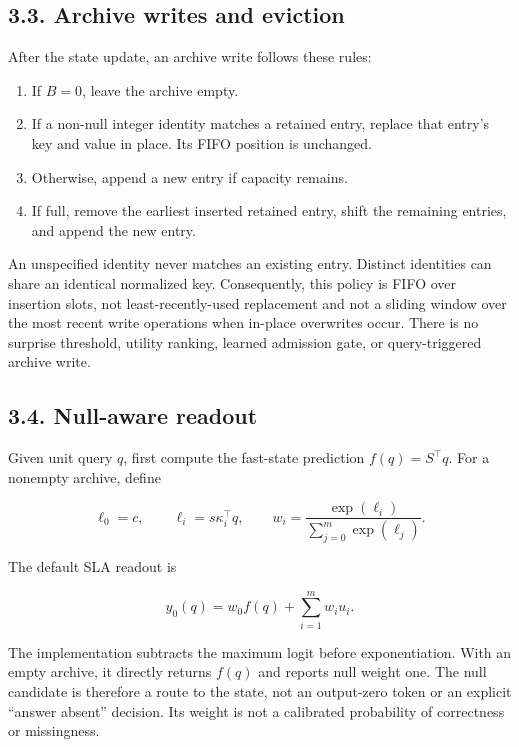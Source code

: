 \documentclass[11pt,a4paper]{article}
\providecommand{\tightlist}{\setlength{\itemsep}{0pt}\setlength{\parskip}{0pt}}
\begin{document}
\subsection{3.3. Archive writes and eviction}\label{archive-writes-and-eviction}

After the state update, an archive write follows these rules:

\begin{enumerate}
\def\labelenumi{\arabic{enumi}.}
\tightlist
\item
  If \(B=0\), leave the archive empty.
\item
  If a non-null integer identity matches a retained entry, replace that entry's key and value in place. Its FIFO position is unchanged.
\item
  Otherwise, append a new entry if capacity remains.
\item
  If full, remove the earliest inserted retained entry, shift the remaining entries, and append the new entry.
\end{enumerate}

An unspecified identity never matches an existing entry. Distinct identities can share an identical normalized key. Consequently, this policy is FIFO over insertion slots, not least-recently-used replacement and not a sliding window over the most recent write operations when in-place overwrites occur. There is no surprise threshold, utility ranking, learned admission gate, or query-triggered archive write.

\subsection{3.4. Null-aware readout}\label{null-aware-readout}

Given unit query \(q\), first compute the fast-state prediction \(f(q)=S^{\top}q\). For a nonempty archive, define

\nopagebreak[4]

\[
\ell_0=c,\qquad \ell_i=s\kappa_i^{\top}q,\qquad
w_i=\frac{\exp(\ell_i)}{\sum_{j=0}^{m}\exp(\ell_j)}.
\tag{2}
\]

The default SLA readout is

\nopagebreak[4]

\[
y_0(q)=w_0f(q)+\sum_{i=1}^{m}w_i u_i. \tag{3}
\]

The implementation subtracts the maximum logit before exponentiation. With an empty archive, it directly returns \(f(q)\) and reports null weight one. The null candidate is therefore a route to the state, not an output-zero token or an explicit ``answer absent'' decision. Its weight is not a calibrated probability of correctness or missingness.
\end{document}
